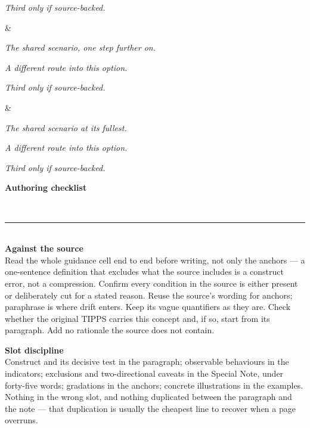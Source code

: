 \documentclass[10pt,a4paper]{article}
\newcommand{\exlistsize}{\scriptsize}
\newcommand{\conceptheader}[2]{%
  \noindent
  \begin{minipage}[c]{13mm}\raggedright
    {\fontsize{30}{30}\selectfont\bfseries\color{tnavy}#1}
  \end{minipage}%
  \begin{minipage}[c]{\dimexpr\linewidth-13mm\relax}\RaggedRight
    {\large\bfseries #2}
  \end{minipage}\\[1.5mm]
  \textcolor{tnavy}{\rule{\linewidth}{1.1pt}}\\[2mm]}
\begin{document}
{\begin{exlist}
  \item \emph{Third only if source-backed.}
\end{exlist} &
\exlistsize\begin{exlist}
  \item \emph{The shared scenario, one step further on.}
  \item \emph{A different route into this option.}
  \item \emph{Third only if source-backed.}
\end{exlist} &
\exlistsize\begin{exlist}
  \item \emph{The shared scenario at its fullest.}
  \item \emph{A different route into this option.}
  \item \emph{Third only if source-backed.}
\end{exlist}
}
 
\clearpage
 
\conceptheader{}{Authoring checklist}
 
\footnotesize
{\bfseries Against the source}\\[1mm]
Read the whole guidance cell end to end before writing, not only the anchors --- a one-sentence definition
that excludes what the source includes is a construct error, not a compression. Confirm every condition in
the source is either present or deliberately cut for a stated reason. Reuse the source's wording for anchors;
paraphrase is where drift enters. Keep its vague quantifiers as they are. Check whether the original TIPPS
carries this concept and, if so, start from its paragraph. Add no rationale the source does not contain.
 
\vspace{2.5mm}
{\bfseries Slot discipline}\\[1mm]
Construct and its decisive test in the paragraph; observable behaviours in the indicators; exclusions and
two-directional caveats in the Special Note, under forty-five words; gradations in the anchors; concrete
illustrations in the examples. Nothing in the wrong slot, and nothing duplicated between the paragraph and
the note --- that duplication is usually the cheapest line to recover when a page overruns.
 
\end{document}
